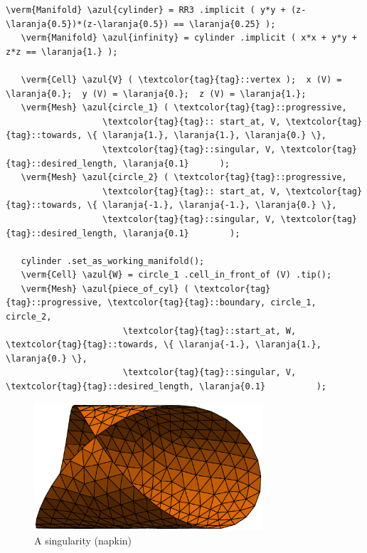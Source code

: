 \begin{Verbatim}[commandchars=\\\{\},formatcom=\small\tt,frame=single,
   label=code not working,rulecolor=\color{coment},
   baselinestretch=0.94,framesep=2mm                                  ]
   \verm{Manifold} \azul{cylinder} = RR3 .implicit ( y*y + (z-\laranja{0.5})*(z-\laranja{0.5}) == \laranja{0.25} );
   \verm{Manifold} \azul{infinity} = cylinder .implicit ( x*x + y*y + z*z == \laranja{1.} );

   \verm{Cell} \azul{V} ( \textcolor{tag}{tag}::vertex );  x (V) = \laranja{0.};  y (V) = \laranja{0.};  z (V) = \laranja{1.};
   \verm{Mesh} \azul{circle_1} ( \textcolor{tag}{tag}::progressive,
                   \textcolor{tag}{tag}:: start_at, V, \textcolor{tag}{tag}::towards, \{ \laranja{1.}, \laranja{1.}, \laranja{0.} \},
                   \textcolor{tag}{tag}::singular, V, \textcolor{tag}{tag}::desired_length, \laranja{0.1}      );
   \verm{Mesh} \azul{circle_2} ( \textcolor{tag}{tag}::progressive,
                   \textcolor{tag}{tag}:: start_at, V, \textcolor{tag}{tag}::towards, \{ \laranja{-1.}, \laranja{-1.}, \laranja{0.} \},
                   \textcolor{tag}{tag}::singular, V, \textcolor{tag}{tag}::desired_length, \laranja{0.1}        );

   cylinder .set_as_working_manifold();
   \verm{Cell} \azul{W} = circle_1 .cell_in_front_of (V) .tip();
   \verm{Mesh} \azul{piece_of_cyl} ( \textcolor{tag}{tag}::progressive, \textcolor{tag}{tag}::boundary, circle_1, circle_2,
                       \textcolor{tag}{tag}::start_at, W, \textcolor{tag}{tag}::towards, \{ \laranja{-1.}, \laranja{1.}, \laranja{0.} \},
                       \textcolor{tag}{tag}::singular, V, \textcolor{tag}{tag}::desired_length, \laranja{0.1}          );
\end{Verbatim}

\begin{figure}[ht] \centering
 \includegraphics[width=85mm]{cyl}
  \caption{A singularity (napkin)}
  \label{\numb section 3.\numb fig 10}
\end{figure}

